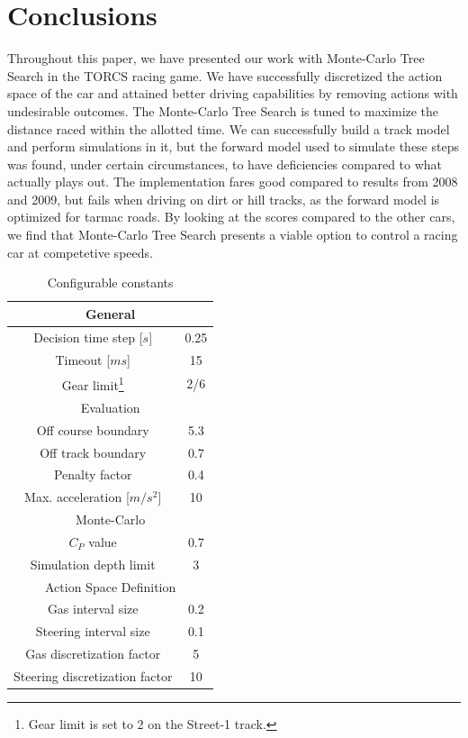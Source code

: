 \documentclass[conference]{IEEEtran}
\begin{document}
\newpage

\section{Conclusions}
\label{sec-conclusion}
Throughout this paper, we have presented our work with Monte-Carlo Tree Search in the TORCS racing game. We have successfully discretized the action space of the car and attained better driving capabilities by removing actions with undesirable outcomes. The Monte-Carlo Tree Search is tuned to maximize the distance raced within the allotted time. We can successfully build a track model and perform simulations in it, but the forward model used to simulate these steps was found, under certain circumstances, to have deficiencies compared to what actually plays out. The implementation fares good compared to results from 2008 and 2009, but fails when driving on dirt or hill tracks, as the forward model is optimized for tarmac roads. By looking at the scores compared to the other cars, we find that Monte-Carlo Tree Search presents a viable option to control a racing car at competetive speeds.

\begin{savenotes}
\begin{table}
\begin{center}
\renewcommand{\arraystretch}{1.3}
\caption{Configurable constants}
\label{tab-config}
\begin{tabular}{|c|c|} \hline
\multicolumn{2}{c}{General} \\ \hline
Decision time step [$s$] & 0.25 \\ \hline
Timeout [$ms$] & 15 \\ \hline
Gear limit\footnote{Gear limit is set to 2 on the Street-1 track.} & 2/6 \\ \hline
\multicolumn{2}{c}{Evaluation} \\ \hline
Off course boundary & 5.3 \\ \hline
Off track boundary & 0.7 \\ \hline
Penalty factor & 0.4 \\ \hline
Max. acceleration [$m/s^2$] & 10 \\ \hline
\multicolumn{2}{c}{Monte-Carlo} \\ \hline
$C_P$ value & 0.7 \\ \hline
Simulation depth limit & 3 \\ \hline
\multicolumn{2}{c}{Action Space Definition} \\ \hline
Gas interval size & 0.2 \\ \hline
Steering interval size & 0.1 \\ \hline
Gas discretization factor & 5 \\ \hline
Steering discretization factor & 10 \\ \hline
\end{tabular}
\end{center}
\end{table}
\end{savenotes}
\end{document}
